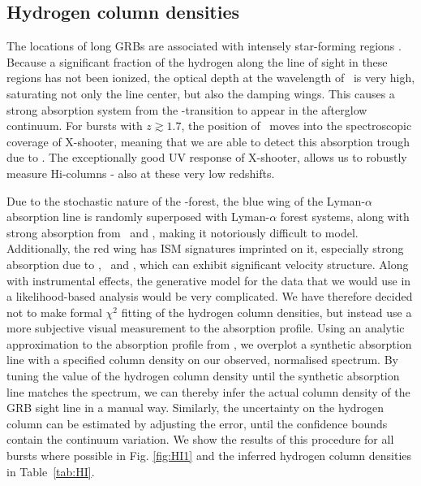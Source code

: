 \documentclass{aa}    %
\begin{document}
 \subsection{Hydrogen column densities}

The locations of long GRBs are associated with intensely star-forming regions
\citep{Hogg1999, Bloom2002, Fruchter2006, Lyman2017}. Because a significant fraction
of the hydrogen along the line of sight in these regions has not been ionized,
the optical depth at the wavelength of \lya~is very high, saturating not only
the line center, but also the damping wings. This causes a strong absorption
system from the \lya-transition to appear in the afterglow continuum. For bursts
with $z \gtrsim 1.7$, the position of \lya~moves into the spectroscopic coverage
of X-shooter, meaning that we are able to detect this absorption trough due to
\lya. The exceptionally good UV response of X-shooter, allows us to robustly
measure H{\sc i}-columns - also at these very low redshifts.

Due to the stochastic nature of the \lya-forest, the blue wing of the
Lyman-$\alpha$ absorption line is randomly superposed with Lyman-$\alpha$ forest
systems, along with strong absorption from \mnii~and \SIiii, making it
notoriously difficult to model. Additionally, the red wing has ISM signatures
imprinted on it, especially strong absorption due to \SIii, \sii~and \nv, which
can exhibit significant velocity structure. Along with instrumental effects, the
generative model for the data that we would use in a likelihood-based analysis
would be very complicated. We have therefore decided not to make formal $\chi^2$
fitting of the hydrogen column densities, but instead use a more subjective
visual measurement to the absorption profile. Using an analytic approximation to
the absorption profile from \citet{TepperGarcia2006}, we overplot a synthetic
absorption line with a specified column density on our observed, normalised
spectrum. By tuning the value of the hydrogen column density until the synthetic
absorption line matches the spectrum, we can thereby infer the actual column
density of the GRB sight line in a manual way. Similarly, the uncertainty on the
hydrogen column can be estimated by adjusting the error, until the confidence
bounds contain the continuum variation. We show the results of this procedure
for all bursts where possible in Fig. \ref{fig:HI1} and the inferred hydrogen
column densities in Table~\ref{tab:HI}.
\end{document}
